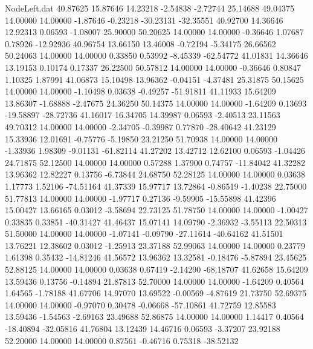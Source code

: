 \begin{filecontents}{NodeLeft.dat}
  40.87625   15.87646   14.23218    -2.54838   -2.72744   25.14688   49.04375   14.00000   14.00000   -1.87646   -0.23218  -30.23131  -32.35551
  40.92700   14.36646   12.92313     0.06593   -1.08007   25.90000   50.20625   14.00000   14.00000   -0.36646    1.07687    0.78926  -12.92936
  40.96754   13.66150   13.46008    -0.72194   -5.34175   26.66562   50.24063   14.00000   14.00000    0.33850    0.53992   -8.45339  -62.54772
  41.01831   14.36646   13.19153     0.10174    0.17337   26.22500   50.57812   14.00000   14.00000   -0.36646    0.80847    1.10325    1.87991
  41.06873   15.10498   13.96362    -0.04151   -4.37481   25.31875   50.15625   14.00000   14.00000   -1.10498    0.03638   -0.49257  -51.91811
  41.11933   15.64209   13.86307    -1.68888   -2.47675   24.36250   50.14375   14.00000   14.00000   -1.64209    0.13693  -19.58897  -28.72736
  41.16017   16.34705   14.39987     0.06593   -2.40513   23.11563   49.70312   14.00000   14.00000   -2.34705   -0.39987    0.77870  -28.40642
  41.23129   15.33936   12.01691    -0.75776   -5.19850   23.21250   51.70938   14.00000   14.00000   -1.33936    1.98309   -9.01131  -61.82114
  41.27202   13.42712   12.62100     0.06593   -1.04426   24.71875   52.12500   14.00000   14.00000    0.57288    1.37900    0.74757  -11.84042
  41.32282   13.96362   12.82227     0.13756   -6.73844   24.68750   52.28125   14.00000   14.00000    0.03638    1.17773    1.52106  -74.51164
  41.37339   15.97717   13.72864    -0.86519   -1.40238   22.75000   51.77813   14.00000   14.00000   -1.97717    0.27136   -9.59905  -15.55898
  41.42396   15.00427   13.66165     0.03012   -3.58694   22.73125   51.78750   14.00000   14.00000   -1.00427    0.33835    0.33851  -40.31427
  41.46437   15.07141   14.09790    -2.36932   -3.55113   22.50313   51.50000   14.00000   14.00000   -1.07141   -0.09790  -27.11614  -40.64162
  41.51501   13.76221   12.38602     0.03012   -1.25913   23.37188   52.99063   14.00000   14.00000    0.23779    1.61398    0.35432  -14.81246
  41.56572   13.96362   13.32581    -0.18476   -5.87894   23.45625   52.88125   14.00000   14.00000    0.03638    0.67419   -2.14290  -68.18707
  41.62658   15.64209   13.59436     0.13756   -0.14894   21.87813   52.70000   14.00000   14.00000   -1.64209    0.40564    1.64565   -1.78188
  41.67706   14.97070   13.69522    -0.00569   -4.87619   21.73750   52.69375   14.00000   14.00000   -0.97070    0.30478   -0.06668  -57.10861
  41.72759   12.85583   13.59436    -1.54563   -2.69163   23.49688   52.86875   14.00000   14.00000    1.14417    0.40564  -18.40894  -32.05816
  41.76804   13.12439   14.46716     0.06593   -3.37207   23.92188   52.20000   14.00000   14.00000    0.87561   -0.46716    0.75318  -38.52132

\end{filecontents}
